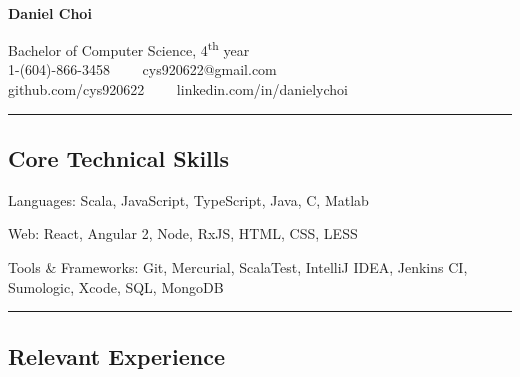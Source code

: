 \documentclass[10pt,letterpaper]{article}
\newenvironment{indentsection}[1]%
{\begin{list}{}%
	{\setlength{\leftmargin}{#1}}%
	\item[]%
}
{\end{list}}
\newcommand{\CPP}
{C\nolinebreak[4]\hspace{-.05em}\raisebox{.22ex}{\footnotesize\bf ++}}
\begin{document}

\begin{center}
\thispagestyle{firststyle}
{\LARGE \textbf{\\Daniel Choi}}

Bachelor of Computer Science, 4\textsuperscript{th} year
\\
1-(604)-866-3458\ \ \textbullet
\ \ cys920622@gmail.com
\\
github.com/cys920622\ \ \textbullet
\ \ linkedin.com/in/danielychoi
\end{center}

\hrule
\vspace{-0.4em}

\subsection*{Core Technical Skills}

\begin{indentsection}{\parindent}
\begin{description*}
	\item[Languages:]
	Scala, JavaScript, TypeScript, Java, \CPP, Matlab
	\item[Web:]
	React, Angular 2, Node, RxJS, HTML, CSS, LESS
	\item[Tools \& Frameworks:]
	Git, Mercurial, ScalaTest, IntelliJ IDEA, Jenkins CI, Sumologic, Xcode, SQL, MongoDB
\end{description*}
\end{indentsection}


\hrule
\vspace{-0.4em}

\subsection*{Relevant Experience}
\end{document}
